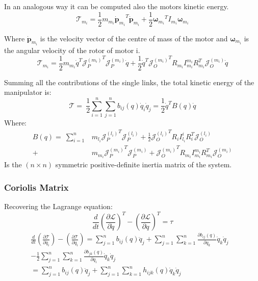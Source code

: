 In an analogous way it can be computed also the motors kinetic energy.
\begin{equation}
	\mathcal{T}_{m_i}=
	\frac{1}{2}m_{m_i}{{\dot{\mathbf{p}}}_{m_i}}^T{\dot{\mathbf{p}}}_{m_i}+\frac{1}{2}{\boldsymbol{\omega}_{m_i}}^TI_{m_i}\boldsymbol{\omega}_{m_i}
\end{equation}

Where ${\dot{\mathbf{p}}}_{m_i}$ is the velocity vector of the centre of mass of the motor and $\boldsymbol{\omega}_{m_i}$ is the angular velocity of the rotor of motor i.
\begin{equation}
	\mathcal{T}_{m_i}=\frac{1}{2}m_{m_i}{\dot{q}}^T{\mathcal{J}_P^{(m_i)}}^T\mathcal{J}_P^{(m_i)}\dot{q}+\frac{1}{2}{\dot{q}}^T{\mathcal{J}_O^{(m_i)}}^TR_{m_i}I_{m_i}^{m_i}R_{m_i}^T\mathcal{J}_O^{(m_i)}\dot{q}
\end{equation}

Summing all the contributions of the single links, the total kinetic energy of the manipulator is:
\begin{equation}
	\mathcal{T}=\ \frac{1}{2}\sum_{i=1}^{n}\sum_{j=1}^{n}{b_{ij}(q){\dot{q}}_i{\dot{q}}_j}=\frac{1}{2}{\dot{q}}^TB\left(q\right)\dot{q}
\end{equation}
Where:
\begin{align*}
	B\left(q\right)=\ \sum_{i=1}^{n} &m_{l_i}{\mathcal{J}_P^{(l_i)}}^T\mathcal{J}_P^{(l_i)}+\frac{1}{2}{\mathcal{J}_O^{(l_i)}}^TR_iI_{l_i}^iR_i^T\mathcal{J}_O^{(l_i)} \\
	+ &m_{m_i}{\mathcal{J}_P^{(m_i)}}^T\mathcal{J}_P^{(m_i)}+{\mathcal{J}_O^{(m_i)}}^TR_{m_i}I_{m_i}^{m_i}R_{m_i}^T\mathcal{J}_O^{(m_i)} 
\end{align*}
Is the $(n\times n)$ symmetric positive-definite inertia matrix of the system.

\subsubsection{Coriolis Matrix}
Recovering the Lagrange equation:
\begin{equation*}
	\frac{d}{dt}\left(\frac{\partial \mathcal{L}}{\partial\dot{q}}\right)^T-\left(\frac{\partial \mathcal{L}}{\partial q}\right)^T=\tau
\end{equation*}
\begin{equation}
	\begin{split}
		\frac{d}{dt}\left(\frac{\partial \mathcal{T}}{\partial\dot{q_i}}\right)-\left(\frac{\partial \mathcal{T}}{\partial q_i}\right)=
		\sum_{j=1}^{n}{b_{ij}\left(q\right){\ddot{q}}_j}+\sum_{j=1}^{n}\sum_{k=1}^{n}{\frac{{\partial b}_{ij}\left(q\right)}{\partial q_k}{\dot{q}}_k{\dot{q}}_j}&\\-\frac{1}{2}\sum_{j=1}^{n}\sum_{k=1}^{n}{\frac{\partial b_{jk}(q)}{\partial q_i}{\dot{q}}_k{\dot{q}}_j}&\\
		=\sum_{j=1}^{n}{b_{ij}\left(q\right){\ddot{q}}_j}+\sum_{j=1}^{n}\sum_{k=1}^{n}{h_{ijk}\left(q\right){\dot{q}}_k{\dot{q}}_j}&
	\end{split}
\end{equation}


